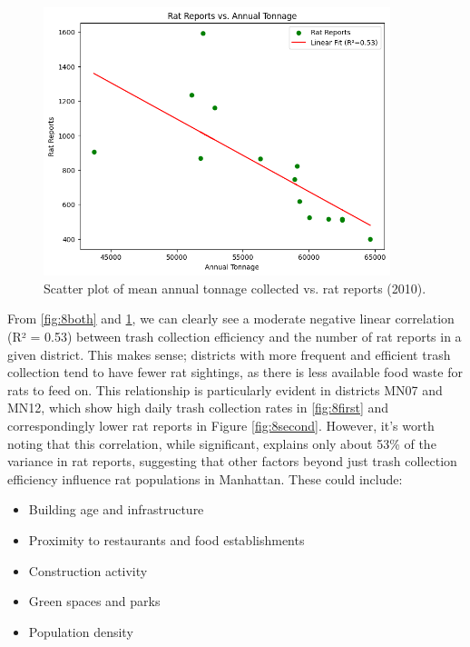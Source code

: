 \documentclass{article}
\begin{document}
\begin{figure}[H]
	\centering
	\includegraphics[width=0.9\textwidth]{figures/correlation.png}
	\caption{Scatter plot of mean annual tonnage collected vs. rat reports (2010).}
	\label{fig:9all}
\end{figure}

From \cref{fig:8both} and \cref{fig:9all}, we can clearly see a moderate negative linear correlation (R² = 0.53) between trash collection efficiency and the number of rat reports in a given district. This makes sense; districts with more frequent and efficient trash collection tend to have fewer rat sightings, as there is less available food waste for rats to feed on. This relationship is particularly evident in districts MN07 and MN12, which show high daily trash collection rates in \cref{fig:8first} and correspondingly lower rat reports in Figure \cref{fig:8second}.
However, it's worth noting that this correlation, while significant, explains only about 53\% of the variance in rat reports, suggesting that other factors beyond just trash collection efficiency influence rat populations in Manhattan. These could include:

\begin{itemize}
    \item Building age and infrastructure
    \item Proximity to restaurants and food establishments
    \item Construction activity
    \item Green spaces and parks
    \item Population density
\end{itemize}
\end{document}
